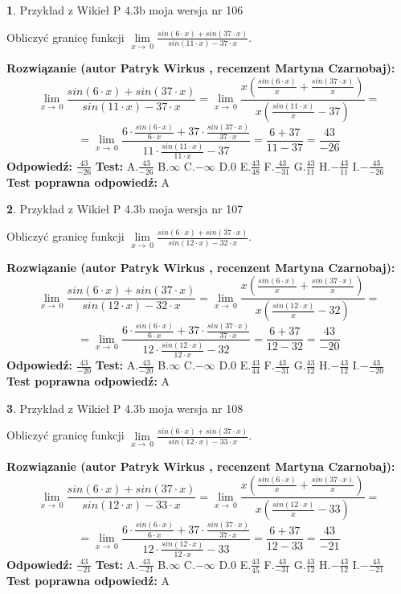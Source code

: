 \documentclass[12pt, a4paper]{article}
\theoremstyle{definition} %
\newtheorem{zad}{}
\newcommand{\zadStart}[1]{\begin{zad}#1\newline}
\newcommand{\zadStop}{\end{zad}}
\newcommand{\rozwStart}[2]{\noindent \textbf{Rozwiązanie (autor #1 , recenzent #2): }\newline}
\newcommand{\rozwStop}{\newline}
\newcommand{\odpStart}{\noindent \textbf{Odpowiedź:}\newline}
\newcommand{\odpStop}{\newline}
\newcommand{\testStart}{\noindent \textbf{Test:}\newline}
\newcommand{\testStop}{\newline}
\newcommand{\kluczStart}{\noindent \textbf{Test poprawna odpowiedź:}\newline}
\newcommand{\kluczStop}{\newline}
\begin{document}
\zadStart{Przykład z Wikieł P 4.3b moja wersja nr 106}


Obliczyć granicę funkcji $\lim\limits_{x\to\ 0}\frac{sin(6 \cdot x)+sin(37 \cdot x)}{sin(11 \cdot x)-37 \cdot x}$.
\zadStop
\rozwStart{Patryk Wirkus}{Martyna Czarnobaj}
$$\lim\limits_{x\to\ 0}\frac{sin(6 \cdot x)+sin(37 \cdot x)}{sin(11 \cdot x)-37 \cdot x}=\lim\limits_{x\to\ 0}\frac{x(\frac{sin(6 \cdot x)}{x}+\frac{sin(37 \cdot x)}{x})}{x(\frac{sin(11 \cdot x)}{x}-37)}=$$
$$=\lim\limits_{x\to\ 0}\frac{6 \cdot \frac{sin(6 \cdot x)}{6 \cdot x}+37 \cdot \frac{sin(37 \cdot x)}{37 \cdot x}}{11 \cdot \frac{sin(11 \cdot x)}{11 \cdot x}-37}=\frac{6+37}{11-37} = \frac{43}{-26}$$
\rozwStop
\odpStart
$\frac{43}{-26}$
\odpStop
\testStart
A.$\frac{43}{-26}$
B.$\infty$
C.$-\infty$
D.$0$
E.$\frac{43}{48}$
F.$\frac{43}{-31}$
G.$\frac{43}{11}$
H.$-\frac{43}{11}$
I.$-\frac{43}{-26}$
\testStop
\kluczStart
A
\kluczStop



\zadStart{Przykład z Wikieł P 4.3b moja wersja nr 107}


Obliczyć granicę funkcji $\lim\limits_{x\to\ 0}\frac{sin(6 \cdot x)+sin(37 \cdot x)}{sin(12 \cdot x)-32 \cdot x}$.
\zadStop
\rozwStart{Patryk Wirkus}{Martyna Czarnobaj}
$$\lim\limits_{x\to\ 0}\frac{sin(6 \cdot x)+sin(37 \cdot x)}{sin(12 \cdot x)-32 \cdot x}=\lim\limits_{x\to\ 0}\frac{x(\frac{sin(6 \cdot x)}{x}+\frac{sin(37 \cdot x)}{x})}{x(\frac{sin(12 \cdot x)}{x}-32)}=$$
$$=\lim\limits_{x\to\ 0}\frac{6 \cdot \frac{sin(6 \cdot x)}{6 \cdot x}+37 \cdot \frac{sin(37 \cdot x)}{37 \cdot x}}{12 \cdot \frac{sin(12 \cdot x)}{12 \cdot x}-32}=\frac{6+37}{12-32} = \frac{43}{-20}$$
\rozwStop
\odpStart
$\frac{43}{-20}$
\odpStop
\testStart
A.$\frac{43}{-20}$
B.$\infty$
C.$-\infty$
D.$0$
E.$\frac{43}{44}$
F.$\frac{43}{-31}$
G.$\frac{43}{12}$
H.$-\frac{43}{12}$
I.$-\frac{43}{-20}$
\testStop
\kluczStart
A
\kluczStop



\zadStart{Przykład z Wikieł P 4.3b moja wersja nr 108}


Obliczyć granicę funkcji $\lim\limits_{x\to\ 0}\frac{sin(6 \cdot x)+sin(37 \cdot x)}{sin(12 \cdot x)-33 \cdot x}$.
\zadStop
\rozwStart{Patryk Wirkus}{Martyna Czarnobaj}
$$\lim\limits_{x\to\ 0}\frac{sin(6 \cdot x)+sin(37 \cdot x)}{sin(12 \cdot x)-33 \cdot x}=\lim\limits_{x\to\ 0}\frac{x(\frac{sin(6 \cdot x)}{x}+\frac{sin(37 \cdot x)}{x})}{x(\frac{sin(12 \cdot x)}{x}-33)}=$$
$$=\lim\limits_{x\to\ 0}\frac{6 \cdot \frac{sin(6 \cdot x)}{6 \cdot x}+37 \cdot \frac{sin(37 \cdot x)}{37 \cdot x}}{12 \cdot \frac{sin(12 \cdot x)}{12 \cdot x}-33}=\frac{6+37}{12-33} = \frac{43}{-21}$$
\rozwStop
\odpStart
$\frac{43}{-21}$
\odpStop
\testStart
A.$\frac{43}{-21}$
B.$\infty$
C.$-\infty$
D.$0$
E.$\frac{43}{45}$
F.$\frac{43}{-31}$
G.$\frac{43}{12}$
H.$-\frac{43}{12}$
I.$-\frac{43}{-21}$
\testStop
\kluczStart
A
\kluczStop
\end{document}
